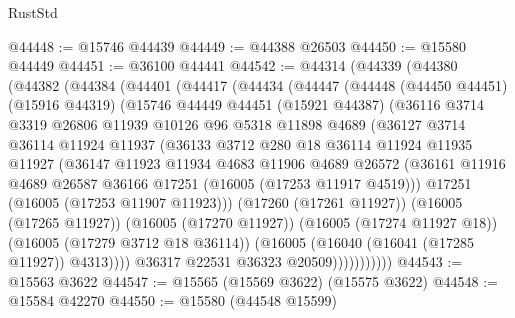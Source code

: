 \begin{lexlean}{RustStd}
\begin{coremodule}
@44448 := @15746 @44439
@44449 := @44388 @26503
@44450 := @15580 @44449
@44451 := @36100 @44441
@44542 := @44314
    (@44339
      (@44380
        (@44382
          (@44384
            (@44401
              (@44417
                (@44434
                  (@44447
                    (@44448
                      (@44450 @44451)
                      (@15916 @44319)
                      (@15746
                        @44449
                        @44451
                        (@15921 @44387)
                        (@36116
                          @3714
                          @3319
                          @26806
                          @11939
                          @10126
                          @96
                          @5318
                          @11898
                          @4689
                          (@36127
                            @3714
                            @36114
                            @11924
                            @11937
                            (@36133
                              @3712
                              @280
                              @18
                              @36114
                              @11924
                              @11935
                              @11927
                              (@36147
                                @11923
                                @11934
                                @4683
                                @11906
                                @4689
                                @26572
                                (@36161
                                  @11916
                                  @4689
                                  @26587
                                  @36166
                                  @17251
                                  (@16005 (@17253 @11917 @4519)))
                                @17251
                                (@16005 (@17253 @11907 @11923)))
                              (@17260 (@17261 @11927))
                              (@16005 (@17265 @11927))
                              (@16005 (@17270 @11927))
                              (@16005 (@17274 @11927 @18))
                              (@16005 (@17279 @3712 @18 @36114))
                              (@16005 (@16040 (@16041 (@17285 @11927)) @4313))))
                          @36317
                          @22531
                          @36323
                          @20509)))))))))))
@44543 := @15563 @3622
@44547 := @15565 (@15569 @3622) (@15575 @3622)
@44548 := @15584 @42270
@44550 := @15580 (@44548 @15599)

\end{coremodule}
\end{lexlean}
